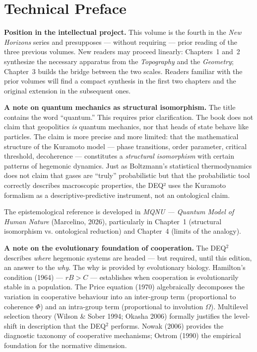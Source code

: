 \documentclass[12pt, twoside]{book}
\theoremstyle{plain}
\theoremstyle{definition}
\theoremstyle{remark}
\begin{document}
\tableofcontents
\cleardoublepage

\chapter*{Technical Preface}

\textbf{Position in the intellectual project.}
This volume is the fourth in the \textit{New Horizons} series and presupposes --- without requiring --- prior reading of the three previous volumes. New readers may proceed linearly: Chapters~1 and~2 synthesize the necessary apparatus from the \textit{Topography} and the \textit{Geometry}; Chapter~3 builds the bridge between the two scales. Readers familiar with the prior volumes will find a compact synthesis in the first two chapters and the original extension in the subsequent ones.

\textbf{A note on quantum mechanics as structural isomorphism.}
The title contains the word ``quantum.'' This requires prior clarification. The book does not claim that geopolitics \textit{is} quantum mechanics, nor that heads of state behave like particles. The claim is more precise and more limited: that the mathematical structure of the Kuramoto model --- phase transitions, order parameter, critical threshold, decoherence --- constitutes a \textit{structural isomorphism} with certain patterns of hegemonic dynamics. Just as Boltzmann's statistical thermodynamics does not claim that gases are ``truly'' probabilistic but that the probabilistic tool correctly describes macroscopic properties, the DEQ² uses the Kuramoto formalism as a descriptive-predictive instrument, not an ontological claim.

The epistemological reference is developed in \textit{MQNU --- Quantum Model of Human Nature} (Marcelino, 2026), particularly in Chapter~1 (structural isomorphism vs. ontological reduction) and Chapter~4 (limits of the analogy).

\textbf{A note on the evolutionary foundation of cooperation.}
The DEQ$^2$ describes \textit{where} hegemonic systems are headed --- but required, until this edition, an answer to the \textit{why}. The why is provided by evolutionary biology. Hamilton's condition (1964) --- $rB > C$ --- establishes when cooperation is evolutionarily stable in a population. The Price equation (1970) algebraically decomposes the variation in cooperative behaviour into an inter-group term (proportional to coherence $\Phi$) and an intra-group term (proportional to involution $\Omega$). Multilevel selection theory (Wilson \& Sober 1994; Okasha 2006) formally justifies the level-shift in description that the DEQ$^2$ performs. Nowak (2006) provides the diagnostic taxonomy of cooperative mechanisms; Ostrom (1990) the empirical foundation for the normative dimension.
\end{document}
